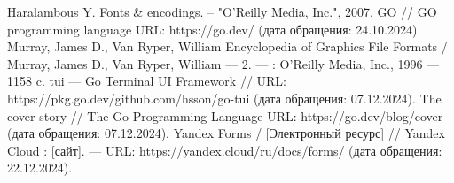 \begin{thebibliography}{}
     Haralambous Y. Fonts \& encodings. – "O'Reilly Media, Inc.", 2007.
     GO // GO programming language URL: https://go.dev/ (дата обращения: 24.10.2024).
     Murray, James D., Van Ryper, William Encyclopedia of Graphics File Formats / Murray, James D., Van Ryper, William — 2. — : O'Reilly Media, Inc., 1996 — 1158 c.
     tui — Go Terminal UI Framework // URL: https://pkg.go.dev/github.com/hsson/go-tui (дата обращения: 07.12.2024).
     The cover story // The Go Programming Language URL: https://go.dev/blog/cover (дата обращения: 07.12.2024).
      Yandex Forms /  [Электронный ресурс] // Yandex Cloud : [сайт]. — URL: https://yandex.cloud/ru/docs/forms/ (дата обращения: 22.12.2024).
\end{thebibliography}
